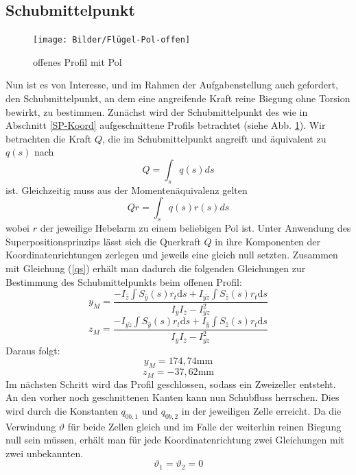 \subsection{Schubmittelpunkt}
\begin{figure}[h]
	\centering
	\texttt{[image: Bilder/Flügel-Pol-offen]}
	\caption{offenes Profil mit Pol}
	\label{Fluegel2}
\end{figure}
Nun ist es von Interesse, und im Rahmen der Aufgabenstellung auch gefordert, den Schubmittelpunkt, an dem eine angreifende Kraft reine Biegung ohne Torsion bewirkt, zu bestimmen.
Zunächst wird der Schubmittelpunkt des wie in Abschnitt \ref{SP-Koord} aufgeschnittene Profils betrachtet (siehe Abb. \ref{Fluegel2}). Wir betrachten die Kraft $Q$, die im Schubmittelpunkt angreift und äquivalent zu $q(s)$ nach
\begin{equation}
	Q=\int_{s}^{}q(s)ds
\end{equation}
ist. Gleichzeitig muss aus der Momentenäquivalenz gelten
\begin{equation}
	Qr=\int_{s}q(s)r(s)ds
\end{equation}
wobei $r$ der jeweilige Hebelarm zu einem beliebigen Pol ist. Unter Anwendung des Superpositionsprinzips lässt sich die Querkraft $Q$ in ihre Komponenten der  Koordinatenrichtungen zerlegen und jeweils eine gleich null setzten. Zusammen mit Gleichung (\ref{qs}) erhält man dadurch die folgenden Gleichungen zur Bestimmung des Schubmittelpunkts beim offenen Profil:
\begin{equation}
	y_{M}=\frac{-I_{\bar{z}}\int S_{\bar{y}}(s) r_{t}\mathrm{d}s+I_{\bar{yz}}\int S_{\bar{z}}(s) r_{t}\mathrm{d}s}{I_{\bar{y}}I_{\bar{z}}-I_{\bar{yz}}^2}
\end{equation}
\begin{equation}
	z_{M}=\frac{-I_{\bar{yz}}\int S_{\bar{y}}(s) r_{t}\mathrm{d}s+I_{\bar{y}}\int S_{\bar{z}}(s) r_{t}\mathrm{d}s}{I_{\bar{y}}I_{\bar{z}}-I_{\bar{yz}}^2}
\end{equation}
Daraus folgt:
$$
	y_{M}=174,74\mathrm{mm}
$$
$$
	z_{M}=-37,62\mathrm{mm}
$$
Im nächsten Schritt wird das Profil geschlossen, sodass ein Zweizeller entsteht. An den vorher noch geschnittenen Kanten kann nun Schubfluss herrschen. Dies wird durch die Konstanten $q_{0b,1}$ und $q_{0b,2}$ in der jeweiligen Zelle erreicht.
Da die Verwindung $\vartheta$ für beide Zellen gleich und im Falle der weiterhin reinen Biegung null sein müssen, erhält man für jede Koordinatenrichtung zwei Gleichungen mit zwei unbekannten.
\begin{equation}
	\vartheta_{1}=\vartheta_{2}=0
\end{equation}
